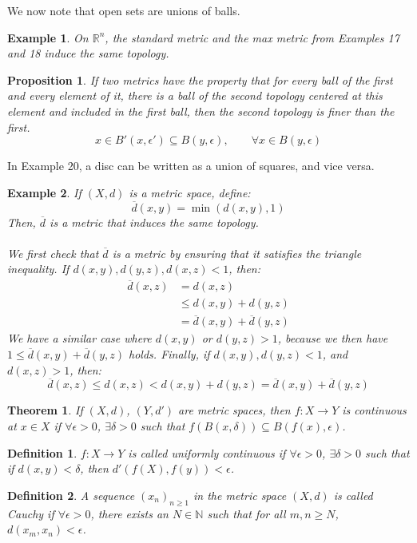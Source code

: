 \documentclass{article}
\newcommand{\R}{\mathbb{R}}
\newcommand{\N}{\mathbb{N}}
\newtheorem{theorem}{Theorem}
\newtheorem{example}{Example}
\newtheorem{proposition}{Proposition}
\newtheorem{definition}{Definition}
\begin{document}
We now note that open sets are unions of balls.
\begin{example}
On $\R^n$, the standard metric and the max metric from Examples 17 and 18 induce the same topology.
\end{example}
\begin{proposition}
If two metrics have the property that for every ball of the first and every element of it, there is a ball of the second topology centered at this element and included in the first ball, then the second topology is finer than the first.
$$x\in B'(x,\epsilon')\subseteq B(y,\epsilon),\qquad \forall x\in B(y,\epsilon)$$
\end{proposition}
\noindent In Example 20, a disc can be written as a union of squares, and vice versa.
\begin{example}
If $(X,d)$ is a metric space, define:
$$\overline{d}(x,y)=\min{(d(x,y),1)}$$
Then, $\overline{d}$ is a metric that induces the same topology. \\
\\
We first check that $\overline{d}$ is a metric by ensuring that it satisfies the triangle inequality. If $d(x,y),d(y,z),d(x,z)<1$, then:
\begin{align*}
    \overline{d}(x,z)&=d(x,z)\\
    &\leq d(x,y) + d(y,z)\\
    &=\overline{d}(x,y)+\overline{d}(y,z)
\end{align*}
We have a similar case where $d(x,y)$ or $d(y,z)>1$, because we then have $1\leq \overline{d}(x,y)+\overline{d}(y,z)$ holds. Finally, if $d(x,y),d(y,z)<1$, and $d(x,z)>1$, then:
$$\overline{d}(x,z)\leq d(x,z)<d(x,y) + d(y,z)=\overline{d}(x,y)+\overline{d}(y,z)$$
\end{example}
\begin{theorem}
If $(X,d)$, $(Y,d')$ are metric spaces, then $f:X\rightarrow Y$ is continuous at $x\in X$ if $\forall \epsilon >0$, $\exists \delta >0$ such that $f(B(x,\delta))\subseteq B(f(x),\epsilon)$.
\end{theorem}
\begin{definition}
$f:X\rightarrow Y$ is called uniformly continuous if $\forall \epsilon >0$, $\exists \delta >0$ such that if $d(x,y)<\delta$, then $d'(f(X),f(y))<\epsilon$.
\end{definition}
\begin{definition}
A sequence $(x_n)_{n\geq 1}$ in the metric space $(X,d)$ is called Cauchy if $\forall \epsilon >0$, there exists an $N\in\N$ such that for all $m,n\geq N$, $d(x_m,x_n)<\epsilon$.
\end{definition}
\end{document}
